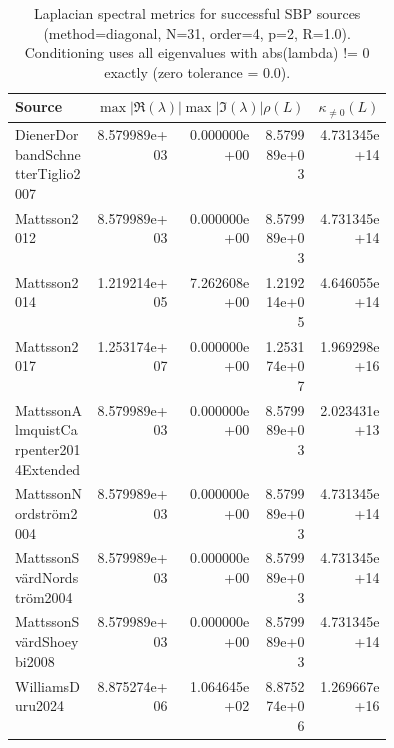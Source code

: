 \documentclass{article}
\begin{document}
\begin{table}[htbp]
\centering
\small
\setlength{\tabcolsep}{4pt}
\begin{tabular}{p{0.44\linewidth}rrrr}
\toprule
Source & $\max |\Re(\lambda)|$ & $\max |\Im(\lambda)|$ & $\rho(L)$ & $\kappa_{\neq 0}(L)$ \\
\midrule
DienerDorbandSchnetterTiglio2007 \cite{dienerdorbandschnettertiglio2007} & 8.579989e+03 & 0.000000e+00 & 8.579989e+03 & 4.731345e+14 \\
Mattsson2012 \cite{mattsson2012} & 8.579989e+03 & 0.000000e+00 & 8.579989e+03 & 4.731345e+14 \\
Mattsson2014 \cite{mattsson2014} & 1.219214e+05 & 7.262608e+00 & 1.219214e+05 & 4.646055e+14 \\
Mattsson2017 \cite{mattsson2017} & 1.253174e+07 & 0.000000e+00 & 1.253174e+07 & 1.969298e+16 \\
MattssonAlmquistCarpenter2014Extended \cite{mattssonalmquistcarpenter2014extended} & 8.579989e+03 & 0.000000e+00 & 8.579989e+03 & 2.023431e+13 \\
MattssonNordström2004 \cite{mattssonnordstrom2004} & 8.579989e+03 & 0.000000e+00 & 8.579989e+03 & 4.731345e+14 \\
MattssonSvärdNordström2004 \cite{mattssonsvardnordstrom2004} & 8.579989e+03 & 0.000000e+00 & 8.579989e+03 & 4.731345e+14 \\
MattssonSvärdShoeybi2008 \cite{mattssonsvardshoeybi2008} & 8.579989e+03 & 0.000000e+00 & 8.579989e+03 & 4.731345e+14 \\
WilliamsDuru2024 \cite{williamsduru2024} & 8.875274e+06 & 1.064645e+02 & 8.875274e+06 & 1.269667e+16 \\
\bottomrule
\end{tabular}
\caption{Laplacian spectral metrics for successful SBP sources (method=diagonal, N=31, order=4, p=2, R=1.0). Conditioning uses all eigenvalues with abs(lambda) != 0 exactly (zero tolerance = 0.0).}
\label{tab:laplacian-spectrum-all-sources}
\end{table}



\end{document}
